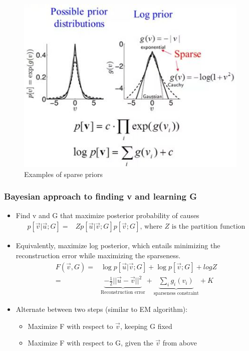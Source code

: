 \documentclass[]{article}
\begin{document}
\begin{figure}[H]
	\begin{center}
		\caption{Examples of sparse priors}
		\includegraphics[width=\textwidth]{sparse-priors}
	\end{center}
\end{figure}

\subsubsection{Bayesian approach to finding v and learning G}

\begin{itemize}
	\item Find v and G that maximize posterior probability of causes
	\begin{align*}
		p[\vec{v}\vert\vec{u};G] =& Z p[\vec{u}\vert\vec{v};G] p[\vec{v};G] \text{, where $Z$ is the partition function}
	\end{align*}
	\item Equivalently, maximize log posterior, which entails minimizing the reconstruction error while maximizing the sparseness. 
	\begin{align*}
		F(\vec{v},G) =& \log p[\vec{u}\vert\vec{v};G] + \log p[\vec{v};G] + log Z\\
		=& \underbrace{-\frac{1}{2} \lvert \lvert \vec{u} -\vec{v} \rvert \rvert^2}_\text{Reconstruction error} + \underbrace{\sum_i g_i(v_i)}_\text{sparseness constraint} + K
	\end{align*}
	\item Alternate between two steps
	(similar to EM algorithm):
	\begin{itemize}
		\item 	Maximize F with respect to $\vec{v}$, 	keeping G fixed
		\item Maximize F with respect to G, given the  $\vec{v}$ from above
	\end{itemize}
\end{itemize}
\end{document}
